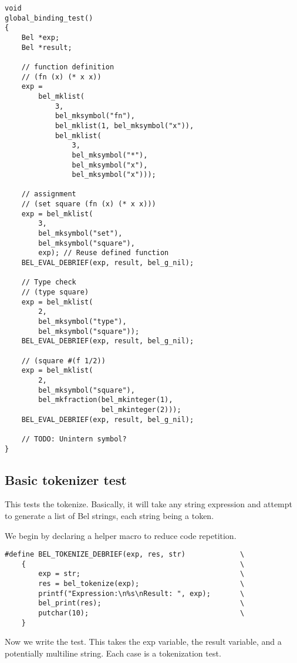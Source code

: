 \documentclass[openright,a4paper,twoside,12pt]{memoir}
\begin{document}
\begin{verbatim}
void
global_binding_test()
{
    Bel *exp;
    Bel *result;

    // function definition
    // (fn (x) (* x x))
    exp =
        bel_mklist(
            3,
            bel_mksymbol("fn"),
            bel_mklist(1, bel_mksymbol("x")),
            bel_mklist(
                3,
                bel_mksymbol("*"),
                bel_mksymbol("x"),
                bel_mksymbol("x")));
    
    // assignment
    // (set square (fn (x) (* x x)))
    exp = bel_mklist(
        3,
        bel_mksymbol("set"),
        bel_mksymbol("square"),
        exp); // Reuse defined function
    BEL_EVAL_DEBRIEF(exp, result, bel_g_nil);

    // Type check
    // (type square)
    exp = bel_mklist(
        2,
        bel_mksymbol("type"),
        bel_mksymbol("square"));
    BEL_EVAL_DEBRIEF(exp, result, bel_g_nil);
    
    // (square #(f 1/2))
    exp = bel_mklist(
        2,
        bel_mksymbol("square"),
        bel_mkfraction(bel_mkinteger(1),
                       bel_mkinteger(2)));
    BEL_EVAL_DEBRIEF(exp, result, bel_g_nil);

    // TODO: Unintern symbol?
}
\end{verbatim}

\subsection{Basic tokenizer test}
\label{sec:org2e8ac0e}

This tests the tokenize. Basically, it will take any string expression
and attempt  to generate a  list of Bel  strings, each string  being a
token.

We begin by declaring a helper macro to reduce code repetition.

\begin{verbatim}
#define BEL_TOKENIZE_DEBRIEF(exp, res, str)             \
    {                                                   \
        exp = str;                                      \
        res = bel_tokenize(exp);                        \
        printf("Expression:\n%s\nResult: ", exp);       \
        bel_print(res);                                 \
        putchar(10);                                    \
    }
\end{verbatim}

Now  we write  the  test.  This takes  the  exp  variable, the  result
variable,  and  a  potentially  multiline   string.  Each  case  is  a
tokenization test.
\end{document}
